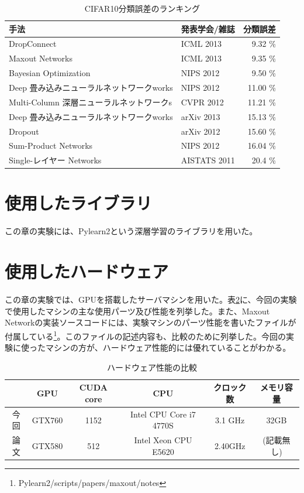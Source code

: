 \begin{table}[tbp]
 \begin{center}
  \begin{tabular}{|l|l|r|}\hline
  手法 & 発表学会/雑誌 & 分類誤差 \\ \hline
DropConnect \cite{wan2013regularization}& ICML 2013 & 9.32 \% \\ \hline
Maxout Networks \cite{goodfellow2013maxout}& ICML 2013 & 9.35 \% \\ \hline
Bayesian Optimization \cite{snoek2012practical}& NIPS 2012 & 9.50 \% \\ \hline
Deep 畳み込みニューラルネットワークworks \cite{krizhevsky2012imagenet}& NIPS 2012 & 11.00 \% \\ \hline
Multi-Column 深層ニューラルネットワークs \cite{ciresan2012multi-column}& CVPR 2012 & 11.21 \% \\ \hline
Deep 畳み込みニューラルネットワークworks \cite{zeiler2013stochastic}& arXiv 2013 & 15.13 \% \\ \hline
Dropout \cite{hinton2012improving}& arXiv 2012 & 15.60 \% \\ \hline
Sum-Product Networks \cite{gens2012discriminative}& NIPS 2012 & 16.04 \% \\ \hline
Single-レイヤー Networks \cite{coates2011an-analysis}& AISTATS 2011 & 20.4 \% \\ \hline
  \end{tabular}
 \end{center}
 \caption{CIFAR10分類誤差のランキング}
 \label{c5_cifar_rank}
\end{table}

\section{使用したライブラリ}
この章の実験には、Pylearn2という深層学習のライブラリを用いた。
\section{使用したハードウェア}
この章の実験では、GPUを搭載したサーバマシンを用いた。表\ref{c5_hardware_spec}に、今回の実験で使用したマシンの主な使用パーツ及び性能を列挙した。また、Maxout Networkの実装ソースコードには、実験マシンのパーツ性能を書いたファイルが付属している\footnote{Pylearn2/scripts/papers/maxout/notes}。このファイルの記述内容も、比較のために列挙した。今回の実験に使ったマシンの方が、ハードウェア性能的には優れていることがわかる。
\begin{table}[tbp]
 \begin{center}
  \begin{tabular}{|c|c|c|c|c|c|}\hline
   & GPU & CUDA core & CPU & クロック数 & メモリ容量\\ \hline
今回 & GTX760 & 1152 & Intel CPU Core i7 4770S & 3.1 GHz & 32GB\\ \hline
論文 & GTX580 & 512 & Intel Xeon CPU E5620 &  2.40GHz & (記載無し)\\ \hline
  \end{tabular}
 \end{center}
 \caption{ハードウェア性能の比較}
 \label{c5_hardware_spec}
\end{table}

